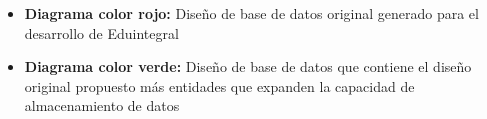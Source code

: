     \begin{itemize}
    
        \item \textbf{Diagrama color rojo:} Diseño de base de datos original generado para el desarrollo de Eduintegral \cite{eduintegral}
        
        \item \textbf{Diagrama color verde:} Diseño de base de datos que contiene el diseño original propuesto más entidades que expanden la capacidad de almacenamiento de datos
        
    \end{itemize}